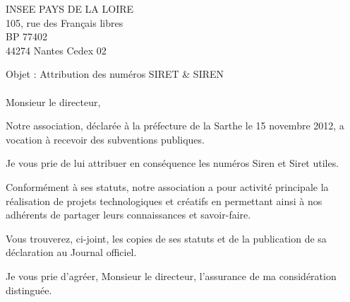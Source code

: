 \documentclass[a4paper,12pt]{letter}
\date{Le Mans, le 20 Août 2014}
\begin{document}
    \begin{letter}{
            INSEE PAYS DE LA LOIRE\\
            105, rue des Français libres\\
            BP 77402\\
            44274 Nantes Cedex 02}
	\opening{Objet : Attribution des numéros SIRET \& SIREN\\\bigskip\\ Monsieur le directeur,}

    Notre association, déclarée à la préfecture de la Sarthe le 15 novembre 2012, a vocation à recevoir des subventions publiques.

    Je vous prie de lui attribuer en conséquence les numéros Siren et Siret utiles.

    Conformément à ses statuts, notre association a pour activité principale la réalisation de projets technologiques
    et créatifs en permettant ainsi à nos adhérents de partager leurs connaissances et savoir-faire.

    Vous trouverez, ci-joint, les copies de ses statuts et de la publication de sa déclaration au Journal officiel.

    \closing{Je vous prie d'agréer, Monsieur le directeur, l'assurance de ma considération distinguée.}

\end{letter}
\end{document}

